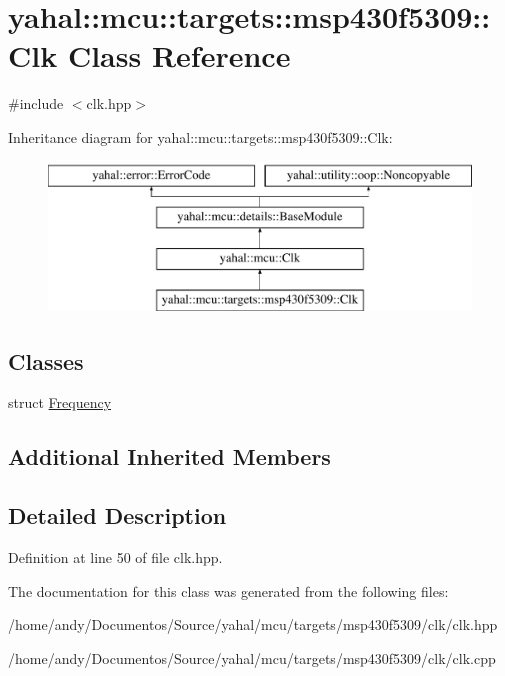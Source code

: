 \hypertarget{classyahal_1_1mcu_1_1targets_1_1msp430f5309_1_1_clk}{}\section{yahal\+:\+:mcu\+:\+:targets\+:\+:msp430f5309\+:\+:Clk Class Reference}
\label{classyahal_1_1mcu_1_1targets_1_1msp430f5309_1_1_clk}


\begin{DoxyVerb}\end{DoxyVerb}
  




{\ttfamily \#include $<$clk.\+hpp$>$}

Inheritance diagram for yahal\+:\+:mcu\+:\+:targets\+:\+:msp430f5309\+:\+:Clk\+:\begin{figure}[H]
\begin{center}
\leavevmode
\includegraphics[height=4.000000cm]{classyahal_1_1mcu_1_1targets_1_1msp430f5309_1_1_clk}
\end{center}
\end{figure}
\subsection*{Classes}
\begin{DoxyCompactItemize}
\item 
struct \hyperlink{structyahal_1_1mcu_1_1targets_1_1msp430f5309_1_1_clk_1_1_frequency}{Frequency}
\end{DoxyCompactItemize}
\subsection*{Additional Inherited Members}


\subsection{Detailed Description}
\begin{DoxyVerb}\end{DoxyVerb}
 

Definition at line 50 of file clk.\+hpp.



The documentation for this class was generated from the following files\+:\begin{DoxyCompactItemize}
\item 
/home/andy/\+Documentos/\+Source/yahal/mcu/targets/msp430f5309/clk/clk.\+hpp\item 
/home/andy/\+Documentos/\+Source/yahal/mcu/targets/msp430f5309/clk/clk.\+cpp\end{DoxyCompactItemize}
